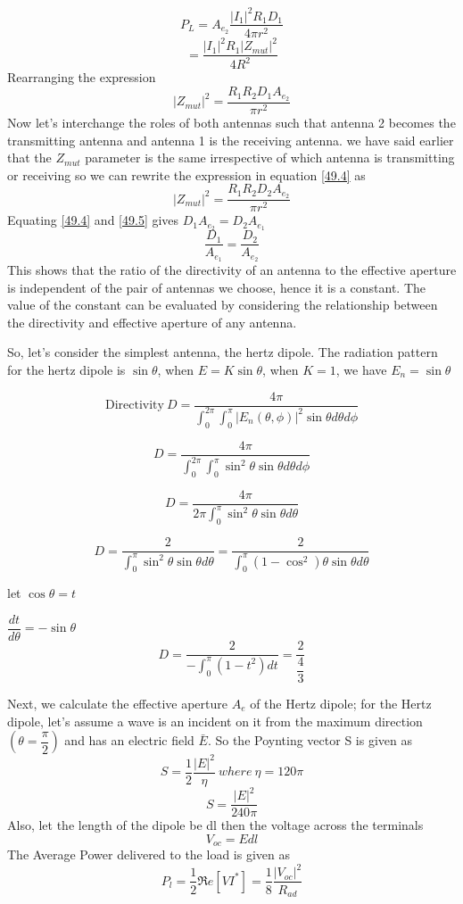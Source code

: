 $$ P_{L} = A_{e_{2}}\dfrac{|I_{1}|^{2}R_{1}D_{1}}{4\pi r^{2}}$$
$$ = \dfrac{|I_{1}|^{2}R_{1}|Z_{mut}|^{2}}{4R^{2}}$$
Rearranging the expression 
\begin{equation}
\label{49.4}
|Z_{mut}|^{2}=\dfrac{R_{1}R_{2}D_{1}A_{e_{2}}}{\pi r^{2}}
\end{equation}
Now let's interchange the roles of both antennas such that antenna 2 becomes the transmitting antenna and antenna 1 is the receiving antenna. we have said earlier that the $Z_{mut}$ parameter is the same irrespective of which antenna is transmitting or receiving so we can rewrite the expression in equation \ref{49.4} as 
\begin{equation}
\label{49.5}
|Z_{mut}|^{2}=\dfrac{R_{1}R_{2}D_{2}A_{e_{2}}}{\pi r^{2}}
\end{equation}
Equating \ref{49.4} and \ref{49.5} gives $D_{1}A_{e_{2}}= D_{2}A_{e_{1}}$
\begin{equation}
\dfrac{D_{1}}{A_{e_{1}}}= \dfrac{D_{2}}{A_{e_{2}}}
\end{equation}
This shows that the ratio of the directivity of an antenna to the effective aperture is independent of the pair of antennas we choose, hence it is a constant. The value of the constant can be evaluated by considering the relationship between the directivity and effective aperture of any antenna.

So, let's consider the simplest antenna, the hertz dipole. The radiation pattern for the hertz dipole is $\sin\theta$, when $E=K\sin\theta$, when $K=1$, we have $E_{n}=\sin\theta$

$$\text{Directivity} \ D=\dfrac{4\pi}{\int_{0}^{2\pi}\int_{0}^{\pi}|E_n(\theta , \phi)|^{2} \sin\theta d\theta d\phi}$$

$$ D=\dfrac{4\pi}{\int_{0}^{2\pi}\int_{0}^{\pi}\sin^{2}\theta \sin\theta d\theta d\phi}$$

$$ D=\dfrac{4\pi}{2\pi\int_{0}^{\pi}\sin^{2}\theta \sin\theta d\theta}$$

$$ D=\dfrac{2}{\int_{0}^{\pi}\sin^{2}\theta \sin\theta d\theta} = \dfrac{2}{\int_{0}^{\pi}(1-\cos^{2})\theta \sin\theta d\theta} $$

let $\cos\theta = t$

$\dfrac{dt}{d\theta}=-\sin\theta$
$$ D=\dfrac{2}{-\int_{0}^{\pi}(1-t^{2})dt} = \dfrac{2}{\dfrac{4}{3}} $$

Next, we calculate the effective aperture $A_{e}$ of the Hertz dipole; for the Hertz dipole, let's assume a wave is an incident on it from the maximum direction $(\theta=\dfrac{\pi}{2})$ and has an electric field $\bar{E}$. So the Poynting vector S is given as 
$$ S= \dfrac{1}{2}\dfrac{|E|^{{2}}}{\eta} \ where \  \eta =120\pi$$
$$ S= \dfrac{|E|^{{2}}}{240\pi}$$
Also, let the length of the dipole be dl then the voltage across the terminals
\begin{equation}
V_{oc}=Edl
\label{eqn21}
\end{equation}
The Average Power delivered to the load is given as
\begin{equation}
P_{l}=\dfrac{1}{2}\Re e [VI^{*}]=\dfrac{1}{8}\dfrac{|V_{oc}|^{2}}{R_{ad}}
\label{eqn22}
\end{equation}

